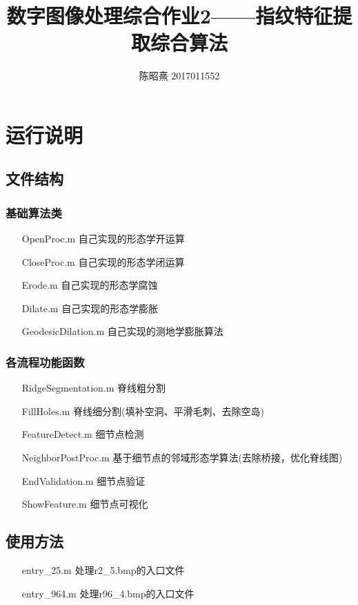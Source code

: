 \documentclass[UTF8]{ctexart}
\begin{document}
\title{数字图像处理综合作业2——指纹特征提取综合算法}
\author{陈昭熹 2017011552}
\maketitle
\tableofcontents
\newpage

\section{运行说明}
\subsection{文件结构}

\subsubsection{基础算法类}
\begin{itemize}
    \item[OpenProc.m] 自己实现的形态学开运算
    \item[CloseProc.m] 自己实现的形态学闭运算
    \item[Erode.m] 自己实现的形态学腐蚀
    \item[Dilate.m] 自己实现的形态学膨胀   
    \item[GeodesicDilation.m] 自己实现的测地学膨胀算法 
\end{itemize}

\subsubsection{各流程功能函数}
\begin{itemize}
    \item[RidgeSegmentation.m] 脊线粗分割
    \item[FillHoles.m] 脊线细分割(填补空洞、平滑毛刺、去除空岛)
    \item[FeatureDetect.m] 细节点检测
    \item[NeighborPostProc.m] 基于细节点的邻域形态学算法(去除桥接，优化脊线图)
    \item[EndValidation.m] 细节点验证
    \item[ShowFeature.m] 细节点可视化     
\end{itemize}
\subsection{使用方法}
\begin{itemize}
    \item[entry\_25.m] 处理r2\_5.bmp的入口文件
    \item[entry\_964.m] 处理r96\_4.bmp的入口文件
\end{itemize}
\end{document}
